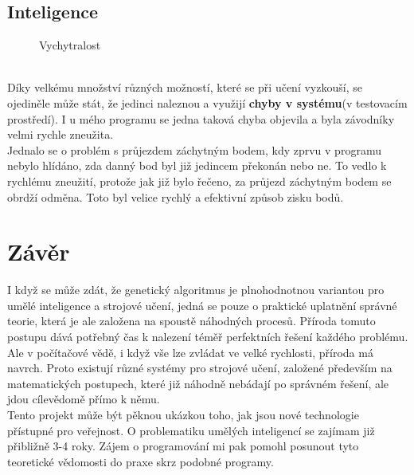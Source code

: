\documentclass[a4paper,12pt]{article}
\newcommand{\tab}
{
    \hspace*{1em}
}
\begin{document}
        \vspace{-2em}
        \subsection{Inteligence}
            \hfill
            \vspace{-2em}
            \begin{figure}
                \centering
                \caption{Vychytralost} 
                \label{fig:intel}
            \end{figure}
            \\
            \tab Díky velkému množství různých možností, které se při učení vyzkouší, se ojediněle může stát,
            že jedinci naleznou a využijí \textbf{chyby v systému}(v testovacím prostředí). 
            I u mého programu se jedna taková chyba objevila a byla závodníky velmi rychle zneužita.\\
            Jednalo se o problém s průjezdem záchytným bodem, kdy zprvu v programu nebylo hlídáno, zda danný 
            bod byl již jedincem překonán nebo ne. To vedlo k rychlému zneužití, protože jak již bylo řečeno,
            za průjezd záchytným bodem se obrdží odměna. Toto byl velice rychlý a efektivní způsob zisku bodů.

    \section{Závěr}
        \tab I když se může zdát, že genetický algoritmus je plnohodnotnou variantou pro umělé inteligence
        a strojové učení, jedná se pouze o praktické uplatnění správné teorie, která je ale založena na spoustě náhodných procesů.
        Příroda tomuto postupu dává potřebný čas k nalezení téměř perfektních řešení každého problému.
        Ale v počítačové vědě, i když vše lze zvládat ve velké rychlosti, příroda má navrch.
        Proto existují různé systémy pro strojové učení, založené především na matematických postupech,
        které již náhodně nebádají po správném řešení, ale jdou cílevědomě přímo k němu.\\
        \tab Tento projekt může být pěknou ukázkou toho, jak jsou nové technologie přístupné pro veřejnost.
        O problematiku umělých inteligencí se zajímam již přibližně 3-4 roky. 
        Zájem o programování mi pak pomohl posunout tyto teoretické vědomosti do praxe skrz podobné programy.
\end{document}
